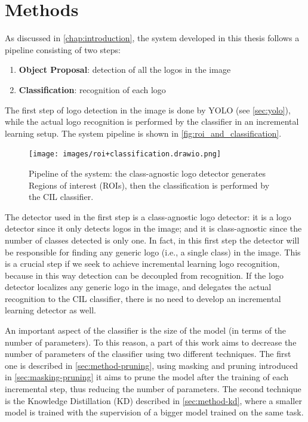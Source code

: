 \chapter{Methods}
\label{chap:methods}

As discussed in \autoref{chap:introduction}, the system developed in this thesis follows a pipeline consisting of two steps:
\begin{enumerate}
    \item \textbf{Object Proposal}: detection of all the logos in the image
    \item \textbf{Classification}: recognition of each logo
\end{enumerate}
The first step of logo detection in the image is done by YOLO (see \autoref{sec:yolo}), while the actual logo recognition is performed by the classifier in an incremental learning setup. The system pipeline is shown in \autoref{fig:roi_and_classification}.

\begin{figure}%
	\centering

    \begin{center}
        \texttt{[image: images/roi+classification.drawio.png]}
    \end{center}

	\caption{Pipeline of the system: the class-agnostic logo detector generates Regions of interest (ROIs), then the classification is performed by the CIL classifier.}%
	\label{fig:roi_and_classification}%
\end{figure}

The detector used in the first step is a class-agnostic logo detector: it is a logo detector since it only detects logos in the image; and it is class-agnostic since the number of classes detected is only one. In fact, in this first step the detector will be responsible for finding any generic logo (i.e., a single class) in the image. This is a crucial step if we seek to achieve incremental learning logo recognition, because in this way detection can be decoupled from recognition. If the logo detector localizes any generic logo in the image, and delegates the actual recognition to the CIL classifier, there is no need to develop an incremental learning detector as well.

An important aspect of the classifier is the size of the model (in terms of the number of parameters). To this reason, a part of this work aims to decrease the number of parameters of the classifier using two different techniques. The first one is described in \autoref{sec:method-pruning}, using masking and pruning introduced in \autoref{sec:masking-pruning} it aims to prune the model after the training of each incremental step, thus reducing the number of parameters. The second technique is the Knowledge Distillation (KD) described in \autoref{sec:method-kd}, where a smaller model is trained with the supervision of a bigger model trained on the same task.


